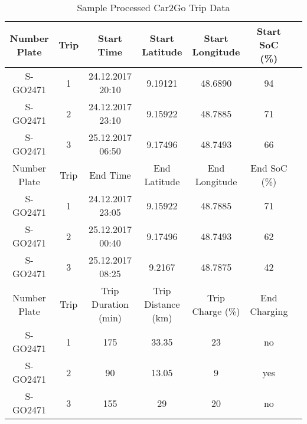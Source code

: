 \begin{sidewaystable}[htbp]
    \caption{Sample Processed Car2Go Trip Data \label{table-car2go-processed}}
    \centering
    \begin{tabular}{cc|ccccc}
      \hline
      \hline
      Number Plate & Trip & Start Time & Start Latitude & Start Longitude & Start SoC (\%)\\
      \hline
      S-GO2471 & 1 & 24.12.2017 20:10 & 9.19121 & 48.6890 & 94\\
      S-GO2471 & 2 & 24.12.2017 23:10 & 9.15922 & 48.7885 & 71\\
      S-GO2471 & 3 & 25.12.2017 06:50 & 9.17496 & 48.7493 & 66\\
      \hline
      Number Plate & Trip & End Time & End Latitude & End Longitude & End SoC (\%)\\
      \hline
      S-GO2471 & 1 & 24.12.2017 23:05 & 9.15922 & 48.7885 & 71\\
      S-GO2471 & 2 & 25.12.2017 00:40 & 9.17496 & 48.7493 & 62\\
      S-GO2471 & 3 & 25.12.2017 08:25 & 9.2167 & 48.7875 & 42\\
      \hline
      Number Plate & Trip & Trip Duration (min) & Trip Distance (km) & Trip Charge (\%) & End Charging\\
      \hline
      S-GO2471 & 1 & 175 & 33.35 & 23 & no\\
      S-GO2471 & 2 & 90 & 13.05 & 9 & yes\\
      S-GO2471 & 3 & 155 & 29 & 20 & no\\
      \hline
      \hline
    \end{tabular}
\end{sidewaystable}
